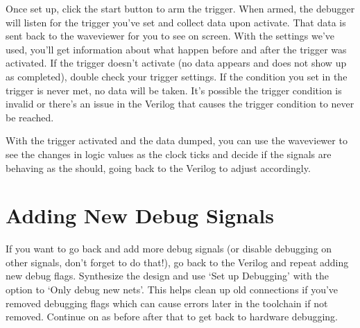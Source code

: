 \documentclass{article}
\begin{document}
Once set up, click the start button to arm the trigger.  When armed,
the debugger will listen for the trigger you've set and collect data
upon activate.  That data is sent back to the waveviewer for you to
see on screen.  With the settings we've used, you'll get information
about what happen before and after the trigger was activated.  If the
trigger doesn't activate (no data appears and does not show up as
completed), double check your trigger settings.  If the condition you
set in the trigger is never met, no data will be taken.  It's possible
the trigger condition is invalid or there's an issue in the Verilog
that causes the trigger condition to never be reached.
	
With the trigger activated and the data dumped, you can use the
waveviewer to see the changes in logic values as the clock ticks and
decide if the signals are behaving as the should, going back to the
Verilog to adjust accordingly.
	
\section{Adding New Debug Signals}
If you want to go back and add more debug signals (or disable
debugging on other signals, don't forget to do that!), go back to the
Verilog and repeat adding new debug flags.  Synthesize the design and
use `Set up Debugging' with the option to `Only debug new nets'.  This
helps clean up old connections if you've removed debugging flags which
can cause errors later in the toolchain if not removed.  Continue on
as before after that to get back to hardware debugging.
	
\end{document}
